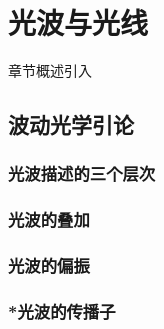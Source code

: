 \chapter{光波与光线}\label{22}

章节概述引入

\section{波动光学引论}\label{22-1}

\subsection{光波描述的三个层次}\label{22-1-1}

\subsection{光波的叠加}\label{22-1-2}

\subsection{光波的偏振}\label{22-1-3}

\subsection{*光波的传播子}\label{22-1-4}
